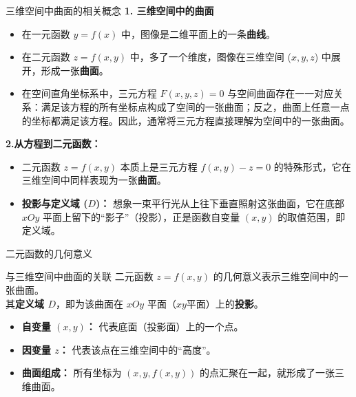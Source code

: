 \documentclass[aspectratio=169,10pt]{ctexbeamer}
\begin{document}
\begin{frame}{三维空间中曲面的相关概念}
	\textbf{1. 三维空间中的曲面}
	\begin{itemize}
		\item 在一元函数 $y = f(x)$ 中，图像是二维平面上的一条\textbf{曲线}。
		\item 在二元函数 $z = f(x, y)$ 中，多了一个维度，图像在三维空间 ($x, y, z$) 中展开，形成一张\textbf{曲面}。
		\item 在空间直角坐标系中，三元方程 $F(x,y,z)=0$ 与空间曲面存在一一对应关系：满足该方程的所有坐标点构成了空间的一张曲面；反之，曲面上任意一点的坐标都满足该方程。因此，通常将三元方程直接理解为空间中的一张曲面。
	\end{itemize}
	
	\textbf{2.从方程到二元函数：}
	\begin{itemize}
		\item 二元函数 $z = f(x, y)$ 本质上是三元方程 $f(x,y) - z = 0$ 的特殊形式，它在三维空间中同样表现为一张\textbf{曲面}。
		\item \textbf{投影与定义域 ($D$)：} 想象一束平行光从上往下垂直照射这张曲面，它在底部 $xOy$ 平面上留下的“影子”（投影），正是函数自变量 $(x, y)$ 的取值范围，即定义域。
	\end{itemize}


		

		
	
\end{frame}

\begin{frame}{二元函数的几何意义}
	\begin{block}{与三维空间中曲面的关联}
		二元函数 $z = f(x, y)$ 的几何意义表示三维空间中的一张曲面。\\
		其\textbf{定义域 $D$}，即为该曲面在 $xOy$ 平面（$xy$平面）上的\textbf{投影}。
	\end{block}
	
	\vspace{0.5cm}
	\begin{itemize}
		\item \textbf{自变量 $(x, y)$：} 代表底面（投影面）上的一个点。
		\item \textbf{因变量 $z$：} 代表该点在三维空间中的“高度”。
		\item \textbf{曲面组成：} 所有坐标为 $(x, y, f(x,y))$ 的点汇聚在一起，就形成了一张三维曲面。
	\end{itemize}
\end{frame}
\end{document}
